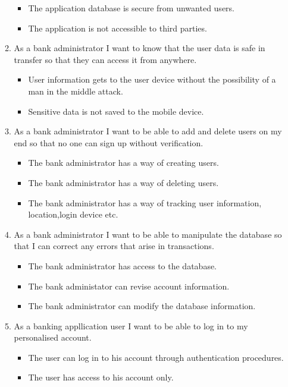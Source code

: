 \begin{itemize}
\begin{enumerate}
\begin{itemize}
                \item The application database is secure from unwanted users.
                \item The application is not accessible to third parties.
            \end{itemize}
        \item As a bank administrator I want to know that the user data is safe in transfer so that they can access it from anywhere.
            \begin{itemize}
                \item User information gets to the user device without the possibility of a man in the middle attack.
                \item Sensitive data is not saved to the mobile device.
            \end{itemize}
        \item As a bank administrator I want to be able to add and delete users on my end so that no one can sign up without verification.
        \begin{itemize}
                \item The bank administrator has a way of creating users.
                \item The bank administrator has a way of deleting users.
                \item The bank administrator has a way of tracking user information, location,login device etc.
            \end{itemize}
        \item As a bank administrator I want to be able to manipulate the database so that I can correct any errors that arise in transactions.
        \begin{itemize}
                \item The bank administrator has access to the database.
                \item The bank administator can revise account information.
                \item The bank administrator can modify the database information.
            \end{itemize}
        \item As a banking appllication user I want to be able to log in to my personalised account.
        \begin{itemize}
                \item The user can log in to his account through authentication procedures.
                \item The user has access to his account only.

\end{itemize}
\end{enumerate}
\end{itemize}
